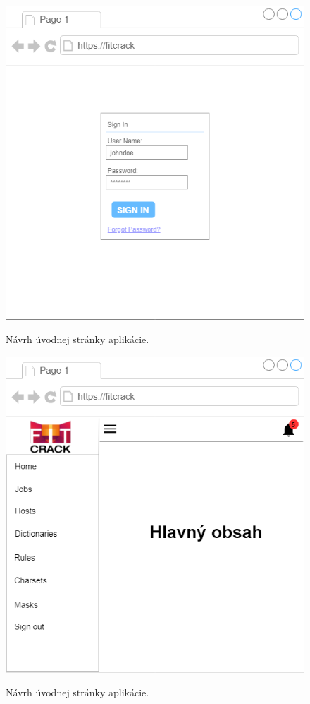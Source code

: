 \documentclass[slovak]{fitthesis}
\begin{document}
\begin{figure}[h]
\centering
\begin{minipage}{.5\textwidth}
    \centering
    \includegraphics[width=0.95\linewidth]{obrazky/loginscreen.png}
    \caption{Návrh úvodnej stránky aplikácie.}
    \label{fig:loginScreen}
\end{minipage}%
\begin{minipage}{.5\textwidth}
    \centering
    \includegraphics[width=0.95\linewidth]{obrazky/mainPage.png}
    \caption{Návrh úvodnej stránky aplikácie.}
    \label{fig:mainPage}\label{fig:mainPage}
\end{minipage}
\end{figure}
\end{document}
